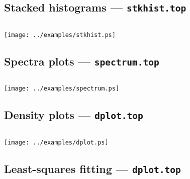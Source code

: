 \newpage

\subsection{Stacked histograms --- {\tt stkhist.top}}

\vspace{1cm}

\begin{verbatim}

\end{verbatim}

\vspace{1cm}
\texttt{[image: ../examples/stkhist.ps]}

\newpage

\subsection{Spectra plots --- {\tt spectrum.top}}

\vspace{0.4cm}

\begin{verbatim}

\end{verbatim}

\vspace{0.4cm}
\texttt{[image: ../examples/spectrum.ps]}

\newpage
\subsection{Density plots --- {\tt dplot.top}}

\vspace{1cm}

\begin{verbatim}

\end{verbatim}

\vspace{1cm}
\texttt{[image: ../examples/dplot.ps]}

\newpage
\subsection{Least-squares fitting --- {\tt dplot.top}}

\vspace{1cm}

\begin{verbatim}

\end{verbatim}

